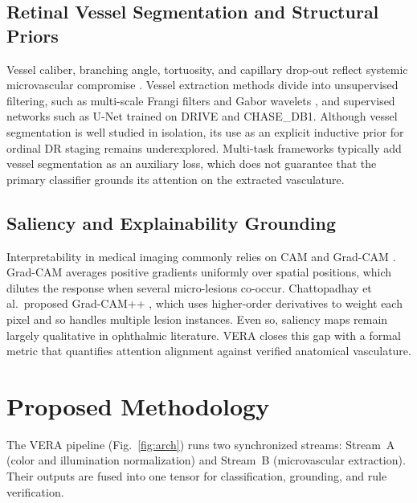 \documentclass[conference]{IEEEtran}
\begin{document}
\subsection{Retinal Vessel Segmentation and Structural Priors}
Vessel caliber, branching angle, tortuosity, and capillary drop-out reflect systemic microvascular compromise \cite{fraz2012}. Vessel extraction methods divide into unsupervised filtering, such as multi-scale Frangi filters \cite{frangi1998} and Gabor wavelets \cite{soares2006}, and supervised networks such as U-Net \cite{ronneberger2015} trained on DRIVE and CHASE\_DB1. Although vessel segmentation is well studied in isolation, its use as an explicit inductive prior for ordinal DR staging remains underexplored. Multi-task frameworks typically add vessel segmentation as an auxiliary loss, which does not guarantee that the primary classifier grounds its attention on the extracted vasculature.

\subsection{Saliency and Explainability Grounding}
Interpretability in medical imaging commonly relies on CAM \cite{zhou2016} and Grad-CAM \cite{selvaraju2017}. Grad-CAM averages positive gradients uniformly over spatial positions, which dilutes the response when several micro-lesions co-occur. Chattopadhay et al.\ proposed Grad-CAM++ \cite{chattopadhay2018}, which uses higher-order derivatives to weight each pixel and so handles multiple lesion instances. Even so, saliency maps remain largely qualitative in ophthalmic literature. VERA closes this gap with a formal metric that quantifies attention alignment against verified anatomical vasculature.

\section{Proposed Methodology}

The VERA pipeline (Fig.~\ref{fig:arch}) runs two synchronized streams: Stream~A (color and illumination normalization) and Stream~B (microvascular extraction). Their outputs are fused into one tensor for classification, grounding, and rule verification.
\end{document}
